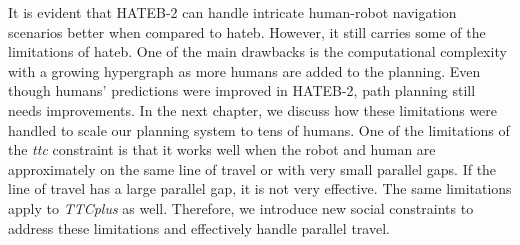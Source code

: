 It is evident that HATEB-2 can handle intricate human-robot navigation scenarios better when compared to \acrshort{hateb}. However, it still carries some of the limitations of \acrshort{hateb}. One of the main drawbacks is the computational complexity with a growing hypergraph as more humans are added to the planning. Even though humans' predictions were improved in HATEB-2, path planning still needs improvements. In the next chapter, we discuss how these limitations were handled to scale our planning system to tens of humans. One of the limitations of the \textit{\acrshort{ttc}} constraint is that it works well when the robot and human are approximately on the same line of travel or with very small parallel gaps. If the line of travel has a large parallel gap, it is not very effective. The same limitations apply to \textit{TTCplus} as well. Therefore, we introduce new social constraints to address these limitations and effectively handle parallel travel.          
